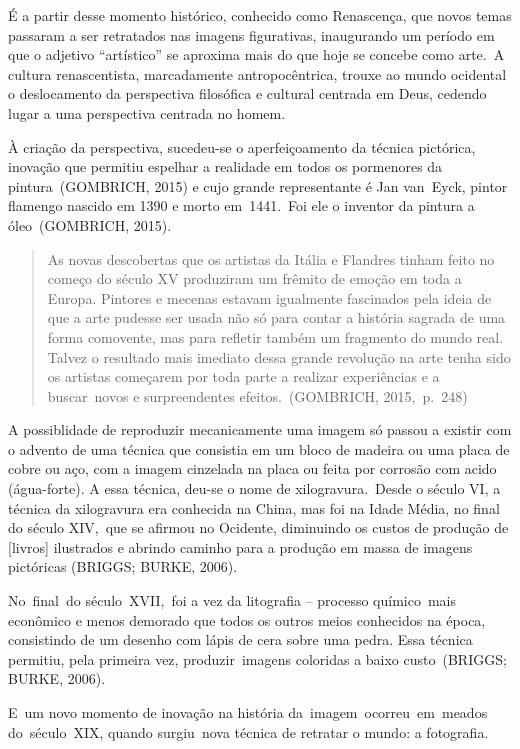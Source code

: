 \documentclass[
  letterpaper,
]{scrbook}
\begin{document}
É a partir desse momento histórico, conhecido como Renascença, que novos
temas passaram a ser retratados nas imagens figurativas, inaugurando um
período em que o adjetivo ``artístico'' se aproxima mais do que hoje se
concebe como arte.~A cultura renascentista, marcadamente
antropocêntrica, trouxe ao mundo ocidental o deslocamento da perspectiva
filosófica e cultural centrada em Deus, cedendo lugar a uma perspectiva
centrada no homem.~

À criação da perspectiva, sucedeu-se o aperfeiçoamento da técnica
pictórica, inovação que permitiu espelhar a realidade em todos os
pormenores da pintura~(GOMBRICH, 2015) e cujo grande representante é Jan
van~Eyck, pintor flamengo nascido em 1390 e morto em~1441.~Foi ele o
inventor da pintura a óleo~(GOMBRICH, 2015).~ ~

\begin{quote}
As novas descobertas que os artistas da Itália e Flandres tinham feito
no começo do século XV produziram um frêmito de emoção em toda a Europa.
Pintores e mecenas estavam igualmente fascinados pela ideia de que a
arte pudesse ser usada não só para contar a história sagrada de uma
forma comovente, mas para refletir também um fragmento do mundo real.
Talvez o resultado mais imediato dessa grande revolução na arte tenha
sido os artistas começarem por toda parte a realizar experiências e a
buscar~novos e surpreendentes efeitos.~(GOMBRICH, 2015,~p.~248)~ ~
\end{quote}

A possiblidade de reproduzir mecanicamente uma imagem só passou a
existir com o advento de uma técnica que consistia em um bloco de
madeira ou uma placa de cobre ou aço, com a imagem cinzelada na placa ou
feita por corrosão com acido (água-forte). A essa técnica, deu-se o nome
de xilogravura.~Desde o século VI, a técnica da xilogravura era
conhecida na China, mas foi na Idade Média, no final do século XIV,~que
se afirmou no Ocidente, diminuindo os custos de produção de {[}livros{]}
ilustrados e abrindo caminho para a produção em massa de imagens
pictóricas (BRIGGS; BURKE, 2006).

No~final~do século~XVII,~foi a vez da litografia -- processo
químico~mais econômico e menos demorado que todos os outros meios
conhecidos na época, consistindo de um desenho com lápis de cera sobre
uma pedra. Essa técnica permitiu, pela primeira vez, produzir~imagens
coloridas a baixo custo~(BRIGGS; BURKE, 2006).~

E~um novo momento de inovação na história da~imagem~ocorreu~em~meados
do~século~XIX, quando surgiu~nova técnica de retratar o mundo: a
fotografia.~
\end{document}
